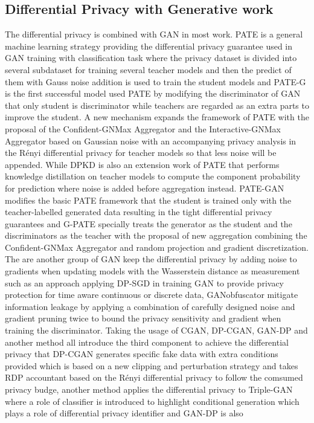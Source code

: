 \documentclass[conference]{IEEEtran}
\begin{document}
\subsection{Differential Privacy with Generative work}
The differential privacy is combined with GAN in most work.
PATE\cite{b6} is a general machine learning strategy providing the differential privacy guarantee used in GAN training with classification task where the privacy dataset is divided into several subdataset for training several teacher models and then the predict of them with Gauss noise addition is used to train the student models and PATE-G is the first successful model used PATE by modifying the discriminator of GAN that only student is discriminator while teachers are regarded as an extra parts to improve the student. A new mechanism\cite{b7} expands the framework of PATE with the proposal of the Confident-GNMax Aggregator and the Interactive-GNMax Aggregator based on Gaussian noise with an accompanying privacy analysis in the Rényi differential privacy for teacher models so that less noise will be appended. While DPKD\cite{b8} is also an extension work of PATE that performs knowledge distillation on teacher models to compute the component probability for prediction where noise is added before aggregation instead. PATE-GAN\cite{b9} modifies the basic PATE framework that the student is trained
only with the teacher-labelled generated data resulting in the tight differential privacy guarantees and G-PATE\cite{b10} specially treats the generator as the student and the discriminators as the teacher with the proposal of new aggregation combining the Confident-GNMax Aggregator and random projection and gradient discretization. The are another group of GAN keep the differential privacy by adding noise to gradients when updating models with the Wasserstein distance as measurement such as an approach\cite{b11} applying DP-SGD in training GAN to provide privacy protection for time aware continuous or discrete data, GANobfuscator\cite{b12} mitigate information leakage by applying a combination of carefully designed noise and gradient pruning twice to bound the privacy sensitivity and gradient when training the discriminator. Taking the usage of CGAN, DP-CGAN\cite{b13}, GAN-DP\cite{b14} and another method\cite{b15} all introduce the third component to achieve the differential privacy that DP-CGAN generates specific fake data with extra conditions provided which is based on a new clipping and perturbation strategy and takes RDP accountant based on the Rényi differential privacy to follow the comsumed privacy budge, another method applies the differential privacy to Triple-GAN where a role of classifier is introduced to highlight conditional generation which plays a role of differential privacy identifier and GAN-DP is also
\end{document}
